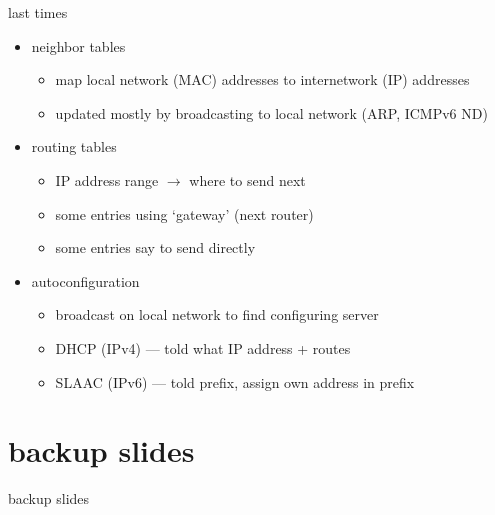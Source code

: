 \date{}
\title{}
\date{}
\usepackage{pgfplots}
\pgfplotsset{compat=1.16}

\begin{frame}
    \titlepage
\end{frame}

\begin{frame}{last times}
    \begin{itemize}
    \item neighbor tables
        \begin{itemize}
        \item map local network (MAC) addresses to internetwork (IP) addresses
        \item updated mostly by broadcasting to local network (ARP, ICMPv6 ND)
        \end{itemize}
    \item routing tables
        \begin{itemize}
        \item IP address range $\rightarrow$ where to send next
        \item some entries using `gateway' (next router)
        \item some entries say to send directly
        \end{itemize}
    \item autoconfiguration
        \begin{itemize}
        \item broadcast on local network to find configuring server
        \item DHCP (IPv4) --- told what IP address + routes
        \item SLAAC (IPv6) --- told prefix, assign own address in prefix
        \end{itemize}
    \end{itemize}
\end{frame}



\section{backup slides}
\begin{frame}{backup slides}
\end{frame}

%



